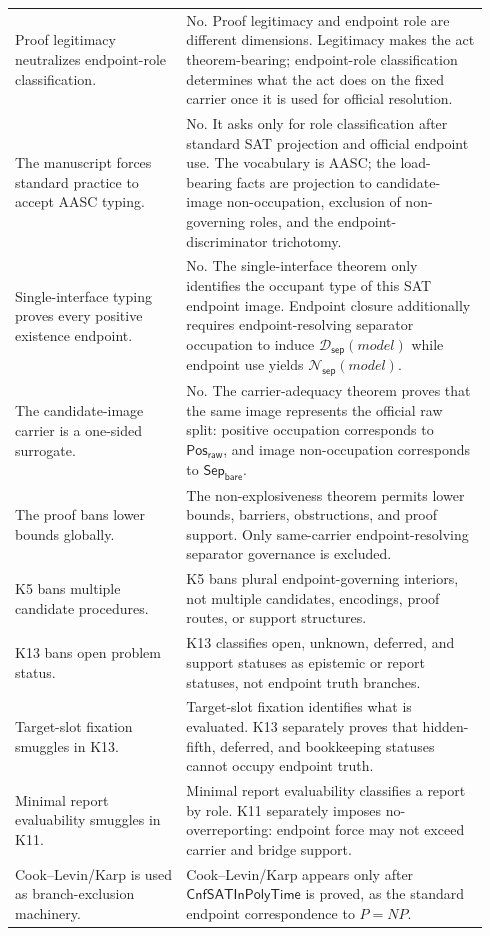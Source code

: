 \documentclass[11pt]{article}
\theoremstyle{definition}
\theoremstyle{remark}
\newcommand{\PosRaw}{\mathsf{Pos}_{\mathsf{raw}}}
\newcommand{\SepBare}{\mathsf{Sep}_{\mathsf{bare}}}
\newcommand{\CnfSATP}{\mathsf{CnfSATInPolyTime}}
\newcommand{\SepDisc}{\mathcal{D}_{\mathsf{sep}}}
\newcommand{\NoSepDisc}{\mathcal{N}_{\mathsf{sep}}}
\begin{document}
{\begin{longtable}{>{\raggedright\arraybackslash}p{0.34\linewidth}>{\raggedright\arraybackslash}p{0.60\linewidth}}
Proof legitimacy neutralizes endpoint-role classification. & No. Proof legitimacy and endpoint role are different dimensions. Legitimacy makes the act theorem-bearing; endpoint-role classification determines what the act does on the fixed carrier once it is used for official resolution. \\
The manuscript forces standard practice to accept AASC typing. & No. It asks only for role classification after standard SAT projection and official endpoint use. The vocabulary is AASC; the load-bearing facts are projection to candidate-image non-occupation, exclusion of non-governing roles, and the endpoint-discriminator trichotomy. \\
Single-interface typing proves every positive existence endpoint. & No. The single-interface theorem only identifies the occupant type of this SAT endpoint image. Endpoint closure additionally requires endpoint-resolving separator occupation to induce \(\SepDisc(model)\) while endpoint use yields \(\NoSepDisc(model)\). \\
The candidate-image carrier is a one-sided surrogate. & No. The carrier-adequacy theorem proves that the same image represents the official raw split: positive occupation corresponds to \(\PosRaw\), and image non-occupation corresponds to \(\SepBare\). \\
The proof bans lower bounds globally. & The non-explosiveness theorem permits lower bounds, barriers, obstructions, and proof support. Only same-carrier endpoint-resolving separator governance is excluded. \\
K5 bans multiple candidate procedures. & K5 bans plural endpoint-governing interiors, not multiple candidates, encodings, proof routes, or support structures. \\
K13 bans open problem status. & K13 classifies open, unknown, deferred, and support statuses as epistemic or report statuses, not endpoint truth branches. \\
Target-slot fixation smuggles in K13. & Target-slot fixation identifies what is evaluated. K13 separately proves that hidden-fifth, deferred, and bookkeeping statuses cannot occupy endpoint truth. \\
Minimal report evaluability smuggles in K11. & Minimal report evaluability classifies a report by role. K11 separately imposes no-overreporting: endpoint force may not exceed carrier and bridge support. \\
Cook--Levin/Karp is used as branch-exclusion machinery. & Cook--Levin/Karp appears only after \(\CnfSATP\) is proved, as the standard endpoint correspondence to \(P=NP\). \\

\end{longtable}}
\end{document}
